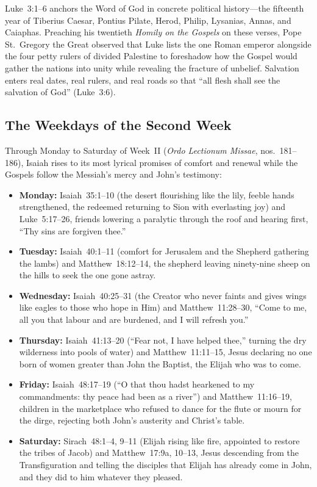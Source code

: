 Luke~3:1--6 anchors the Word of God in concrete political history---the fifteenth year of Tiberius Caesar, Pontius Pilate, Herod, Philip, Lysanias, Annas, and Caiaphas. Preaching his twentieth \textit{Homily on the Gospels} on these verses, Pope St.~Gregory the Great observed that Luke lists the one Roman emperor alongside the four petty rulers of divided Palestine to foreshadow how the Gospel would gather the nations into unity while revealing the fracture of unbelief. Salvation enters real dates, real rulers, and real roads so that ``all flesh shall see the salvation of God'' (Luke~3:6).

\subsection{The Weekdays of the Second Week}

Through Monday to Saturday of Week~II (\textit{Ordo Lectionum Missae}, nos.~181--186), Isaiah rises to its most lyrical promises of comfort and renewal while the Gospels follow the Messiah's mercy and John's testimony:

\begin{itemize}
  \item \textbf{Monday:} Isaiah~35:1--10 (the desert flourishing like the lily, feeble hands strengthened, the redeemed returning to Sion with everlasting joy) and Luke~5:17--26, friends lowering a paralytic through the roof and hearing first, ``Thy sins are forgiven thee.''
  \item \textbf{Tuesday:} Isaiah~40:1--11 (comfort for Jerusalem and the Shepherd gathering the lambs) and Matthew~18:12--14, the shepherd leaving ninety-nine sheep on the hills to seek the one gone astray.
  \item \textbf{Wednesday:} Isaiah~40:25--31 (the Creator who never faints and gives wings like eagles to those who hope in Him) and Matthew~11:28--30, ``Come to me, all you that labour and are burdened, and I will refresh you.''
  \item \textbf{Thursday:} Isaiah~41:13--20 (``Fear not, I have helped thee,'' turning the dry wilderness into pools of water) and Matthew~11:11--15, Jesus declaring no one born of women greater than John the Baptist, the Elijah who was to come.
  \item \textbf{Friday:} Isaiah~48:17--19 (``O that thou hadst hearkened to my commandments: thy peace had been as a river'') and Matthew~11:16--19, children in the marketplace who refused to dance for the flute or mourn for the dirge, rejecting both John's austerity and Christ's table.
  \item \textbf{Saturday:} Sirach~48:1--4, 9--11 (Elijah rising like fire, appointed to restore the tribes of Jacob) and Matthew~17:9a, 10--13, Jesus descending from the Transfiguration and telling the disciples that Elijah has already come in John, and they did to him whatever they pleased.
\end{itemize}

